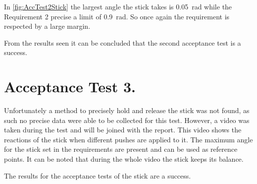 In \autoref{fig:AccTest2Stick} the largest angle the stick takes is \SI{0.05}{\radian} while the Requirement 2 precise a limit of \SI{0.9}{\radian}. So once again the requirement is respected by a large margin.

From the results seen it can be concluded that the second acceptance test is a success.

\section{Acceptance Test 3.}

Unfortunately a method to precisely hold and release the stick was not found, as such no precise data were able to be collected for this test. However, a video was taken during the test and will be joined with the report. This video shows the reactions of the stick when different pushes are applied to it. The maximum angle for the stick set in the requirements are present and can be used as reference points. It can be noted that during the whole video the stick keeps its balance.

The results for the acceptance tests of the stick are a success.